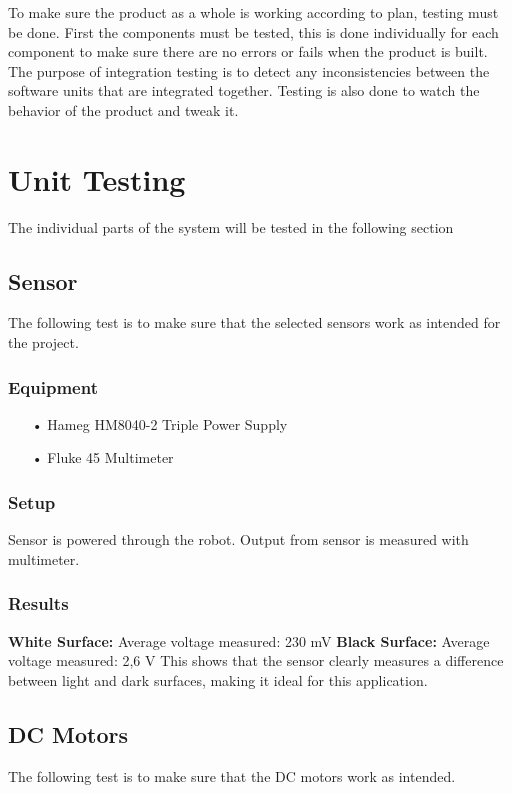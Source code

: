 To make sure the product as a whole is working according to plan, testing must be done. First the components must be tested, this is done individually for each component to make sure there are no errors or fails when the product is built. The purpose of integration testing is to detect any inconsistencies between the software units that are integrated together. Testing is also done to watch the behavior of the product and tweak it.

\section{Unit Testing}
The individual parts of the system will be tested in the following section
\subsection{Sensor}
The following test is to make sure that the selected sensors work as intended for the project.

\subsubsection{Equipment}
\begin{enumerate}
    \item[•]Hameg HM8040-2 Triple Power Supply
	\item[•]Fluke 45 Multimeter
\end{enumerate}

\subsubsection{Setup}
Sensor is powered through the robot.
Output from sensor is measured with multimeter.

\subsubsection{Results}
\textbf{White Surface:}
Average voltage measured: 230 mV\newline
\textbf{Black Surface:}
Average voltage measured: 2,6 V\newline
This shows that the sensor clearly measures a difference between light and dark surfaces, making it ideal for this application.

\subsection{DC Motors}
The following test is to make sure that the DC motors work as intended.

